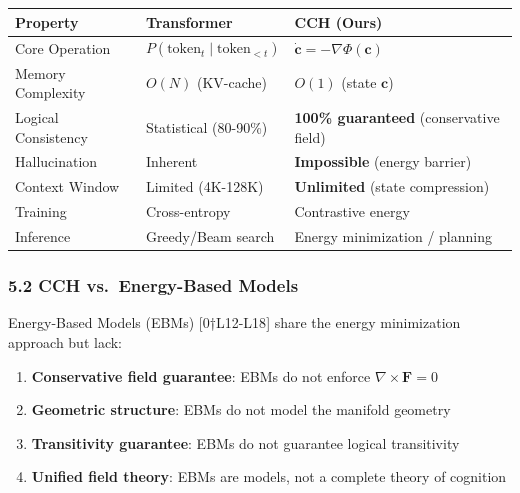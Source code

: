 \documentclass[
  11pt,
  a4paper,
]{article}
\providecommand{\tightlist}{%
  \setlength{\itemsep}{0pt}\setlength{\parskip}{0pt}}
\begin{document}
\begin{longtable}[]{@{}
  >{\raggedright\arraybackslash}p{}
  >{\raggedright\arraybackslash}p{}
  >{\raggedright\arraybackslash}p{}@{}}
\toprule\noalign{}
\begin{minipage}[b]{\linewidth}\raggedright
Property
\end{minipage} & \begin{minipage}[b]{\linewidth}\raggedright
Transformer
\end{minipage} & \begin{minipage}[b]{\linewidth}\raggedright
CCH (Ours)
\end{minipage} \\
\midrule\noalign{}
\endhead
\bottomrule\noalign{}
\endlastfoot
Core Operation & \(P(\text{token}_t \mid \text{token}_{<t})\) &
\(\dot{\mathbf{c}} = -\nabla \Phi(\mathbf{c})\) \\
Memory Complexity & \(O(N)\) (KV-cache) & \(O(1)\) (state
\(\mathbf{c}\)) \\
Logical Consistency & Statistical (80-90\%) & \textbf{100\% guaranteed}
(conservative field) \\
Hallucination & Inherent & \textbf{Impossible} (energy barrier) \\
Context Window & Limited (4K-128K) & \textbf{Unlimited} (state
compression) \\
Training & Cross-entropy & Contrastive energy \\
Inference & Greedy/Beam search & Energy minimization / planning \\
\end{longtable}

\subsubsection{5.2 CCH vs.~Energy-Based
Models}\label{cch-vs.-energy-based-models}

Energy-Based Models (EBMs) {[}0†L12-L18{]} share the energy minimization
approach but lack:

\begin{enumerate}
\def\labelenumi{\arabic{enumi}.}
\tightlist
\item
  \textbf{Conservative field guarantee}: EBMs do not enforce
  \(\nabla \times \mathbf{F} = 0\)
\item
  \textbf{Geometric structure}: EBMs do not model the manifold geometry
\item
  \textbf{Transitivity guarantee}: EBMs do not guarantee logical
  transitivity
\item
  \textbf{Unified field theory}: EBMs are models, not a complete theory
  of cognition
\end{enumerate}
\end{document}
